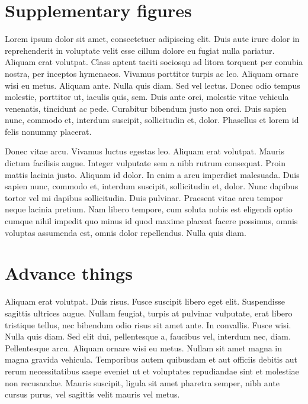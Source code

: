 \chapter{Supplementary figures}\label{append:figs}
Lorem ipsum dolor sit amet, consectetuer adipiscing elit. Duis aute irure dolor in reprehenderit in voluptate velit esse cillum dolore eu fugiat nulla pariatur. Aliquam erat volutpat. Class aptent taciti sociosqu ad litora torquent per conubia nostra, per inceptos hymenaeos. Vivamus porttitor turpis ac leo. Aliquam ornare wisi eu metus. Aliquam ante. Nulla quis diam. Sed vel lectus. Donec odio tempus molestie, porttitor ut, iaculis quis, sem. Duis ante orci, molestie vitae vehicula venenatis, tincidunt ac pede. Curabitur bibendum justo non orci. Duis sapien nunc, commodo et, interdum suscipit, sollicitudin et, dolor. Phasellus et lorem id felis nonummy placerat.

Donec vitae arcu. Vivamus luctus egestas leo. Aliquam erat volutpat. Mauris dictum facilisis augue. Integer vulputate sem a nibh rutrum consequat. Proin mattis lacinia justo. Aliquam id dolor. In enim a arcu imperdiet malesuada. Duis sapien nunc, commodo et, interdum suscipit, sollicitudin et, dolor. Nunc dapibus tortor vel mi dapibus sollicitudin. Duis pulvinar. Praesent vitae arcu tempor neque lacinia pretium. Nam libero tempore, cum soluta nobis est eligendi optio cumque nihil impedit quo minus id quod maxime placeat facere possimus, omnis voluptas assumenda est, omnis dolor repellendus. Nulla quis diam.


\chapter{Advance things}
Aliquam erat volutpat. Duis risus. Fusce suscipit libero eget elit. Suspendisse sagittis ultrices augue. Nullam feugiat, turpis at pulvinar vulputate, erat libero tristique tellus, nec bibendum odio risus sit amet ante. In convallis. Fusce wisi. Nulla quis diam. Sed elit dui, pellentesque a, faucibus vel, interdum nec, diam. Pellentesque arcu. Aliquam ornare wisi eu metus. Nullam sit amet magna in magna gravida vehicula. Temporibus autem quibusdam et aut officiis debitis aut rerum necessitatibus saepe eveniet ut et voluptates repudiandae sint et molestiae non recusandae. Mauris suscipit, ligula sit amet pharetra semper, nibh ante cursus purus, vel sagittis velit mauris vel metus.





